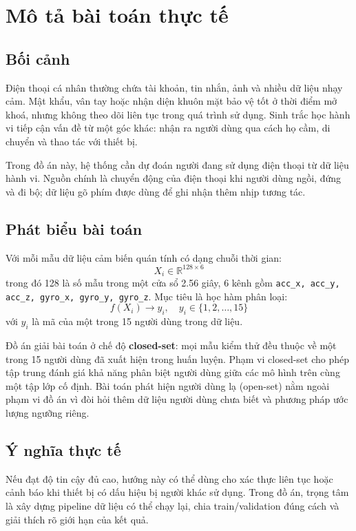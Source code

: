 \documentclass[12pt,a4paper]{article}
\begin{document}
\newpage

\section{Mô tả bài toán thực tế}

\subsection{Bối cảnh}

Điện thoại cá nhân thường chứa tài khoản, tin nhắn, ảnh và nhiều dữ liệu nhạy cảm. Mật khẩu, vân tay hoặc nhận diện khuôn mặt bảo vệ tốt ở thời điểm mở khoá, nhưng không theo dõi liên tục trong quá trình sử dụng. Sinh trắc học hành vi tiếp cận vấn đề từ một góc khác: nhận ra người dùng qua cách họ cầm, di chuyển và thao tác với thiết bị.

Trong đồ án này, hệ thống cần dự đoán người đang sử dụng điện thoại từ dữ liệu hành vi. Nguồn chính là chuyển động của điện thoại khi người dùng ngồi, đứng và đi bộ; dữ liệu gõ phím được dùng để ghi nhận thêm nhịp tương tác.

\subsection{Phát biểu bài toán}

Với mỗi mẫu dữ liệu cảm biến quán tính có dạng chuỗi thời gian:
\[
X_i \in \mathbb{R}^{128 \times 6}
\]
trong đó 128 là số mẫu trong một cửa sổ 2.56 giây, 6 kênh gồm \texttt{acc\_x, acc\_y, acc\_z, gyro\_x, gyro\_y, gyro\_z}. Mục tiêu là học hàm phân loại:
\[
f(X_i) \rightarrow y_i, \quad y_i \in \{1, 2, \dots, 15\}
\]
với \(y_i\) là mã của một trong 15 người dùng trong dữ liệu.

Đồ án giải bài toán ở chế độ \textbf{closed-set}: mọi mẫu kiểm thử đều thuộc về một trong 15 người dùng đã xuất hiện trong huấn luyện. Phạm vi closed-set cho phép tập trung đánh giá khả năng phân biệt người dùng giữa các mô hình trên cùng một tập lớp cố định. Bài toán phát hiện người dùng lạ (open-set) nằm ngoài phạm vi đồ án vì đòi hỏi thêm dữ liệu người dùng chưa biết và phương pháp ước lượng ngưỡng riêng.

\subsection{Ý nghĩa thực tế}

Nếu đạt độ tin cậy đủ cao, hướng này có thể dùng cho xác thực liên tục hoặc cảnh báo khi thiết bị có dấu hiệu bị người khác sử dụng. Trong đồ án, trọng tâm là xây dựng pipeline dữ liệu có thể chạy lại, chia train/validation đúng cách và giải thích rõ giới hạn của kết quả.
\end{document}
